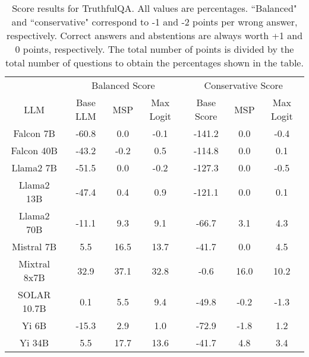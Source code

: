 \renewcommand\arraystretch{1.2}
\begin{table*}
\centering
\begin{tabular}{c|c|c|c|c|c|c}
& \multicolumn{3}{c|}{Balanced Score} & \multicolumn{3}{c}{Conservative Score} \\ 
LLM & Base LLM & MSP & Max Logit & Base Score & MSP & Max Logit\\ \hline
Falcon 7B & -60.8 & 0.0 & -0.1 & -141.2 & 0.0 & -0.4\\
Falcon 40B & -43.2 & -0.2 & 0.5 & -114.8 & 0.0 & 0.1\\
Llama2 7B & -51.5 & 0.0 & -0.2 & -127.3 & 0.0 & -0.5\\
Llama2 13B & -47.4 & 0.4 & 0.9 & -121.1 & 0.0 & 0.1\\
Llama2 70B & -11.1 & 9.3 & 9.1 & -66.7 & 3.1 & 4.3\\
Mistral 7B & 5.5 & 16.5 & 13.7 & -41.7 & 0.0 & 4.5\\
Mixtral 8x7B & 32.9 & 37.1 & 32.8 & -0.6 & 16.0 & 10.2\\
SOLAR 10.7B & 0.1 & 5.5 & 9.4 & -49.8 & -0.2 & -1.3\\
Yi 6B & -15.3 & 2.9 & 1.0 & -72.9 & -1.8 & 1.2\\
Yi 34B & 5.5 & 17.7 & 13.6 & -41.7 & 4.8 & 3.4\\
\hline
\end{tabular}
\caption{Score results for TruthfulQA. All values are percentages. ``Balanced" and ``conservative" correspond to -1 and -2 points per wrong answer, respectively. Correct answers and abstentions are always worth +1 and 0 points, respectively. The total number of points is divided by the total number of questions to obtain the percentages shown in the table.}
\label{tab:truthfulqa_score}
\end{table*}

